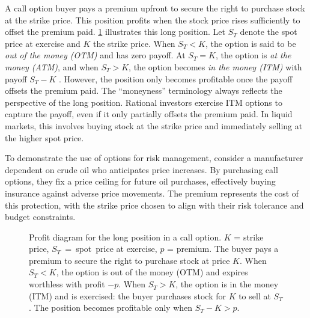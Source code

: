 \documentclass[english,12pt,a4paper,pdftex,sci,utf8]{aaltothesis}
\begin{document}
A call option buyer pays a premium upfront to secure the right to purchase stock at the strike price. This position profits when the stock price rises sufficiently to offset the premium paid. \cref{fig:long_call_payoff} illustrates this long position. Let $S_T$ denote the spot price at exercise and $K$ the strike price. When $S_T < K$, the option is said to be \emph{out of the money (OTM)} and has zero payoff. At $S_T = K$, the option is \emph{at the money (ATM)}, and when $S_T > K$, the option becomes \emph{in the money (ITM)} with payoff $S_T - K$ \cite{hull2018}. However, the position only becomes profitable once the payoff offsets the premium paid. The ``moneyness'' terminology always reflects the perspective of the long position. Rational investors exercise ITM options to capture the payoff, even if it only partially offsets the premium paid. In liquid markets, this involves buying stock at the strike price and immediately selling at the higher spot price.

To demonstrate the use of options for risk management, consider a manufacturer dependent on crude oil who anticipates price increases. By purchasing call options, they fix a price ceiling for future oil purchases, effectively buying insurance against adverse price movements. The premium represents the cost of this protection, with the strike price chosen to align with their risk tolerance and budget constraints.

\begin{center}
\begin{figure}[H]
\centering
    \caption{Profit diagram for the long position in a call option. $K$ = strike price, \mbox{$S_T$ = spot price} at exercise, $p$ = premium. The buyer pays a premium to secure the right to purchase stock at price $K$. When $S_T < K$, the option is out of the money (OTM) and expires worthless with profit $-p$. When $S_T > K$, the option is in the money (ITM) and is exercised: the buyer purchases stock for $K$ to sell at $S_T$. The position becomes profitable only when $S_T - K > p$.}
    \label{fig:long_call_payoff}
\end{figure}
\end{center}
\end{document}
